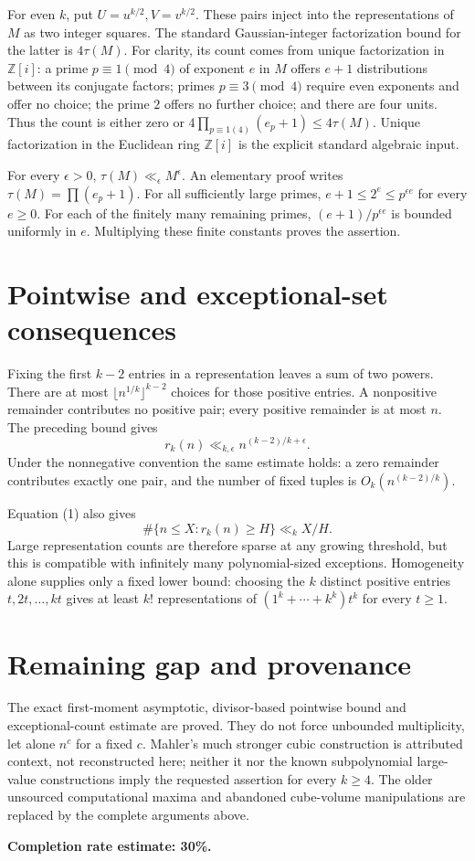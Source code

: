 \documentclass[11pt]{article}
\begin{document}
For even $k$, put $U=u^{k/2},V=v^{k/2}$. These pairs inject into the representations of $M$ as two integer squares. The standard Gaussian-integer factorization bound for the latter is $4\tau(M)$. For clarity, its count comes from unique factorization in $\mathbb Z[i]$: a prime $p\equiv1\pmod4$ of exponent $e$ in $M$ offers $e+1$ distributions between its conjugate factors; primes $p\equiv3\pmod4$ require even exponents and offer no choice; the prime $2$ offers no further choice; and there are four units. Thus the count is either zero or $4\prod_{p\equiv1(4)}(e_p+1)\le4\tau(M)$. Unique factorization in the Euclidean ring $\mathbb Z[i]$ is the explicit standard algebraic input.

For every $\epsilon>0$, $\tau(M)\ll_\epsilon M^\epsilon$. An elementary proof writes $\tau(M)=\prod(e_p+1)$. For all sufficiently large primes, $e+1\le2^e\le p^{\epsilon e}$ for every $e\ge0$. For each of the finitely many remaining primes, $(e+1)/p^{\epsilon e}$ is bounded uniformly in $e$. Multiplying these finite constants proves the assertion.

\section*{Pointwise and exceptional-set consequences}
Fixing the first $k-2$ entries in a representation leaves a sum of two powers. There are at most $\lfloor n^{1/k}\rfloor^{k-2}$ choices for those positive entries. A nonpositive remainder contributes no positive pair; every positive remainder is at most $n$. The preceding bound gives
\[
 r_k(n)\ll_{k,\epsilon}n^{(k-2)/k+\epsilon}. \tag{2}
\]
Under the nonnegative convention the same estimate holds: a zero remainder contributes exactly one pair, and the number of fixed tuples is $O_k(n^{(k-2)/k})$.

Equation (1) also gives
\[
 \#\{n\le X:r_k(n)\ge H\}\ll_k X/H. \tag{3}
\]
Large representation counts are therefore sparse at any growing threshold, but this is compatible with infinitely many polynomial-sized exceptions. Homogeneity alone supplies only a fixed lower bound: choosing the $k$ distinct positive entries $t,2t,\ldots,kt$ gives at least $k!$ representations of $(1^k+\cdots+k^k)t^k$ for every $t\ge1$.

\section*{Remaining gap and provenance}
The exact first-moment asymptotic, divisor-based pointwise bound and exceptional-count estimate are proved. They do not force unbounded multiplicity, let alone $n^c$ for a fixed $c$. Mahler's much stronger cubic construction is attributed context, not reconstructed here; neither it nor the known subpolynomial large-value constructions imply the requested assertion for every $k\ge4$. The older unsourced computational maxima and abandoned cube-volume manipulations are replaced by the complete arguments above.

\textbf{Completion rate estimate: 30\%.}
\end{document}
